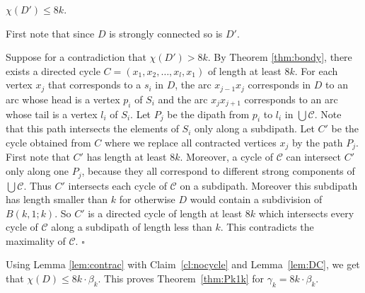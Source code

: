 \documentclass{endm}
\begin{document}
\begin{lemma}\label{cl:nocycle}
$\chi(D') \leq 8k$.
\end{lemma} 
First note that since $D$ is strongly connected so is $D'$. 

Suppose for a contradiction that $\chi(D') > 8k$. By Theorem \ref{thm:bondy}, there exists
a directed cycle $C = (x_1, x_2, \dots , x_l, x_1)$ of length at least $8k$. 	
For each vertex $x_j$ that corresponds to a $s_i$ in $D$, the arc $x_{j-1}x_j$ corresponds in $D$ to an arc whose head is a vertex $p_i$ of $S_i$ and the arc $x_jx_{j+1}$ corresponds to an arc whose tail is a vertex $l_i$ of $S_i$. Let $P_j$ be the dipath 
		from $p_i$ to $l_i$ in $\bigcup \mathcal{C}$. Note that this path intersects the elements of $S_i$ only along a subdipath. 
Let $C'$ be the cycle obtained from $C$ where we replace all contracted vertices $x_j$ by the path $P_j$. 
First note that $C'$ has length at least $8k$. Moreover, a cycle of $\mathcal{C}$  can
intersect $C'$ only along one $P_j$, because they all correspond to different strong components of $\bigcup \mathcal{C}$. Thus $C'$ intersects  each cycle of $\mathcal{C}$ on a subdipath. Moreover this subdipath has length smaller than $k$ for otherwise $D$ would contain 
a subdivision of $B(k,1;k)$. So $C'$ is a directed cycle of length at least $8k$ which intersects every cycle of $\mathcal{C}$ along a 
subdipath of length less than $k$. This contradicts the maximality of $\mathcal{C}$.
\hfill $\square$

\medskip

Using Lemma \ref{lem:contrac} with
Claim~\ref{cl:nocycle} and Lemma~\ref{lem:DC}, we get that $\chi(D) \leq 8k \cdot \beta_k$.
This proves Theorem~\ref{thm:Pk1k} for $\gamma_k=8k\cdot \beta_k$.
\end{document}
